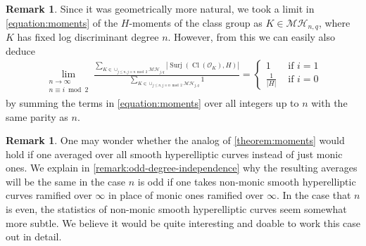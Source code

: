 \documentclass[12 pt]{amsart}
\theoremstyle{plain}
\theoremstyle{definition}
\newtheorem{remark}[theorem]{Remark}
\theoremstyle{remark}
\numberwithin{equation}{section}
\DeclareMathOperator\cl{Cl}
\DeclareMathOperator\surj{Surj}
\begin{document}
\begin{remark}
	\label{remark:}
	Since it was geometrically more natural, we took a limit in
	\eqref{equation:moments} of the $H$-moments of the class group as $K \in
	\mathcal{MH}_{n,q}$, where $K$ has fixed log discriminant degree $n$. However,
	from this we can easily also deduce
	\begin{align}
		\label{equation:moments-sum}
		\lim_{\substack{n \to \infty \\ n \equiv i \bmod 2 }}
		\frac{\sum_{K \in \cup_{j \leq n, j \equiv n \bmod 2} \mathcal{MH}_{j,q}}
\left|\surj(\cl(\mathscr O_K), H) \right|} {\sum_{K \in \cup_{j \leq n, j \equiv n
	\bmod 2}\mathcal{MH}_{j,q}} 1} =
	\begin{cases}
		1 & \text{ if } i =1 \\
		\frac{1}{|H|} & \text{ if } i = 0
	\end{cases}
	\end{align}
	by summing the terms in \eqref{equation:moments} over all
	integers up to $n$ with the same parity as $n$.
\end{remark}
\begin{remark}
\label{remark:non-monic}
One may wonder whether the analog of \autoref{theorem:moments} would hold if one
averaged over all smooth hyperelliptic curves instead of just monic ones.
We explain in \autoref{remark:odd-degree-independence} why the resulting
averages will be the same in the case $n$ is odd if one takes non-monic smooth hyperelliptic curves ramified
over $\infty$ in place
of monic ones ramified over $\infty$.
In the case that $n$ is even, the statistics of non-monic smooth hyperelliptic curves
seem somewhat more subtle.
We believe it would be quite interesting and doable to work this case out in detail.
\end{remark}
\end{document}
